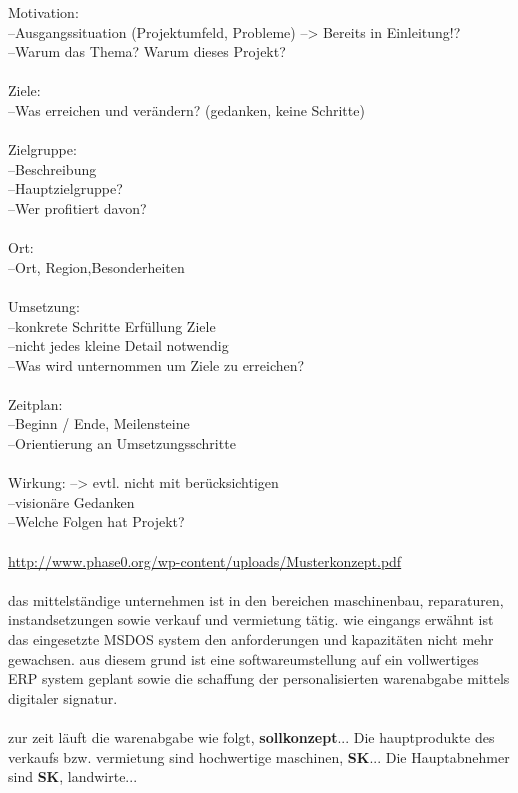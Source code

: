 Motivation:\\
--Ausgangssituation (Projektumfeld, Probleme) --> Bereits in Einleitung!?\\
--Warum das Thema? Warum dieses Projekt?\\\\
Ziele:\\
--Was erreichen und verändern? (gedanken, keine Schritte)\\\\
Zielgruppe:\\
--Beschreibung\\
--Hauptzielgruppe?\\
--Wer profitiert davon?\\\\
Ort:\\
--Ort, Region,Besonderheiten\\\\
Umsetzung:\\
--konkrete Schritte Erfüllung Ziele\\
--nicht jedes kleine Detail notwendig\\
--Was wird unternommen um Ziele zu erreichen?\\\\
Zeitplan:\\
--Beginn / Ende, Meilensteine\\
--Orientierung an Umsetzungsschritte\\\\
Wirkung: --> evtl. nicht mit berücksichtigen\\
--visionäre Gedanken\\
--Welche Folgen hat Projekt?\\\\
\url{http://www.phase0.org/wp-content/uploads/Musterkonzept.pdf}\\\\
das mittelständige unternehmen ist in den bereichen maschinenbau, reparaturen, instandsetzungen sowie verkauf und vermietung tätig. wie eingangs erwähnt ist das eingesetzte MSDOS system den anforderungen und kapazitäten nicht mehr gewachsen. aus diesem grund ist eine softwareumstellung auf ein vollwertiges ERP system geplant sowie die schaffung der personalisierten warenabgabe mittels digitaler signatur.\\\\
zur zeit läuft die warenabgabe wie folgt, \textbf{sollkonzept}... Die hauptprodukte des verkaufs bzw. vermietung sind hochwertige maschinen, \textbf{SK}... Die Hauptabnehmer sind \textbf{SK}, landwirte... \cite{einleitung1}

